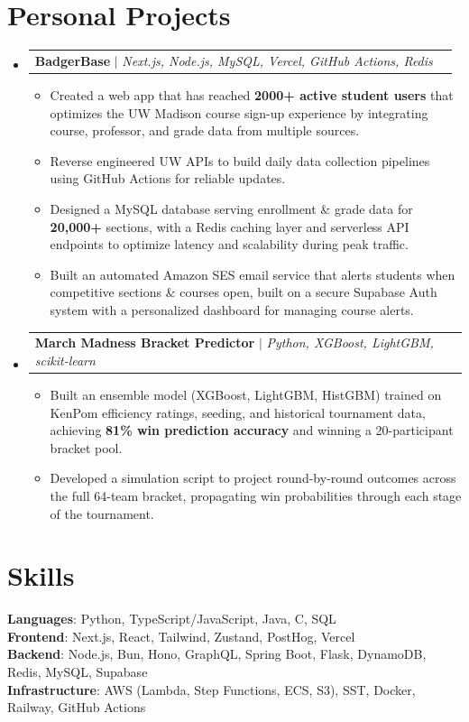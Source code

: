 \documentclass[letterpaper,11pt]{article}
\makeatletter
\newcommand{\resumeItem}[1]{
  \item\small{
    {#1 \vspace{-2pt}}
  }
}
\newcommand{\resumeProjectHeading}[2]{
    \item
    \begin{tabular*}{0.97\textwidth}{l@{\extracolsep{\fill}}r}
      \small#1 & #2 \\
    \end{tabular*}\vspace{-7pt}
}
\newcommand{\resumeSubHeadingListStart}{\begin{itemize}[leftmargin=0.15in, label={}]}
\newcommand{\resumeSubHeadingListEnd}{\end{itemize}}
\newcommand{\resumeItemListStart}{\begin{itemize}}
\newcommand{\resumeItemListEnd}{\end{itemize}\vspace{-5pt}}
\makeatother
\begin{document}

\section{Personal Projects}
    \resumeSubHeadingListStart
      \resumeProjectHeading
          {\textbf{BadgerBase} \href{https://www.badgerbase.app/}{\faLink} \hspace{0.01cm}  $|$ \emph{Next.js, Node.js, MySQL, Vercel, GitHub Actions, Redis}}{}
          \resumeItemListStart  
            \resumeItem{Created a web app that has reached \textbf{2000+ active student users} that optimizes the UW Madison course sign-up experience by integrating course, professor, and grade data from multiple sources.}
            \resumeItem{Reverse engineered UW APIs to build daily data collection pipelines using GitHub Actions for reliable updates.}
            \resumeItem{Designed a MySQL database serving enrollment \& grade data for \textbf{20,000+} sections, with a Redis caching layer and serverless API endpoints to optimize latency and scalability during peak traffic.}
\resumeItem{Built an automated Amazon SES email service that alerts students when competitive sections \& courses open, built on a secure Supabase Auth system with a personalized dashboard for managing course alerts.}

 \resumeItemListEnd

\resumeProjectHeading
    {\textbf{March Madness Bracket Predictor} $|$ \emph{Python, XGBoost, LightGBM, scikit-learn}}{}
    \resumeItemListStart
        \resumeItem{Built an ensemble model (XGBoost, LightGBM, HistGBM) trained on KenPom efficiency ratings, seeding, and historical tournament data, achieving \textbf{81\% win prediction accuracy} and winning a 20-participant bracket pool.}
        \resumeItem{Developed a simulation script to project round-by-round outcomes across the full 64-team bracket, propagating win probabilities through each stage of the tournament.}
    \resumeItemListEnd
    
    
    \resumeSubHeadingListEnd

\section{Skills}
 \begin{itemize}[leftmargin=0.15in, label={}]
    \small{\item{
     \textbf{Languages}{: Python, TypeScript/JavaScript, Java, C, SQL} \\[1pt]
  \textbf{Frontend}{: Next.js, React, Tailwind, Zustand, PostHog, Vercel} \\[1pt]
  \textbf{Backend}{: Node.js, Bun, Hono, GraphQL, Spring Boot, Flask, DynamoDB, Redis, MySQL, Supabase} \\[1pt]
  \textbf{Infrastructure}{: AWS (Lambda, Step Functions, ECS, S3), SST, Docker, Railway,
  GitHub Actions}
    }}
 \end{itemize}




\end{document}
